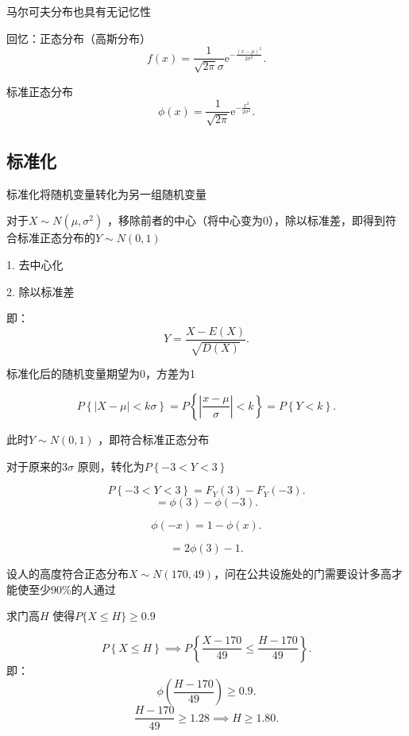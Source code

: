 \begin{notation}
	马尔可夫分布也具有无记忆性
\end{notation}
回忆：正态分布（高斯分布）
\[
	f\left( x \right) =\frac{1}{\sqrt{2\pi} \sigma}\text{e}^{-\frac{ (x-\mu)^2 }{2\sigma^2}}
.\] 

标准正态分布\[
	\phi\left( x \right) =\frac{1}{\sqrt{2\pi} }\text{e}^{-\frac{x^2}{2\sigma^2}}
.\] 
\subsection{标准化}%
\label{sub:标准化}
\begin{defi}
	标准化将随机变量转化为另一组随机变量

	对于$X\sim N\left( \mu,\sigma^2 \right) $ ，移除前者的中心（将中心变为0），除以标准差，即得到符合标准正态分布的$Y\sim N\left( 0,1 \right) $
\end{defi}

1. 去中心化

2. 除以标准差

即：
\[
	Y=\frac{X-E\left( X \right) }{\sqrt{D\left( X \right) } }
.\] 

标准化后的随机变量期望为0，方差为1

\[
	P\left\{ \left| X-\mu \right| <k\sigma \right\} =P\left\{ \left| \frac{x-\mu}{\sigma} \right| <k \right\} =P\left\{ Y<k \right\} 
.\] 

此时$Y\sim N\left( 0,1 \right) $ ，即符合标准正态分布

对于原来的$3\sigma$ 原则，转化为$P\left\{ -3<Y<3 \right\} $

\[
	P\left\{ -3<Y<3 \right\} = F_{Y}\left( 3 \right) -F_{Y}\left( -3 \right)
.\] 
\[
	=\phi\left( 3 \right) -\phi\left( -3 \right) 
.\] 
\begin{notation}
	 \[
		\phi\left( -x \right) =1-\phi\left( x \right)
	.\] 
\end{notation}
\[
	=2\phi\left( 3 \right) -1
.\] 

\begin{eg}
	设人的高度符合正态分布$X\sim N\left( 170,49 \right) $，问在公共设施处的门需要设计多高才能使至少90\%的人通过

	求门高$H$ 使得$P\{X\le H\}\ge 0.9$

	\[
		P\left\{ X\le H \right\} \implies P\left\{ \frac{X-170}{49}\le \frac{H-170}{49} \right\} 
	.\]
	即：
	\[
		\phi\left( \frac{H-170}{49} \right) \ge 0.9
	.\] 
	 \[
		\frac{H-170}{49}\ge 1.28 \implies H\ge 1.80
	.\] 
\end{eg}

